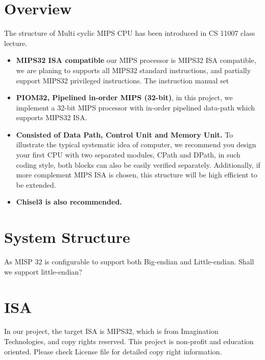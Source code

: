 \documentclass[a4paper]{article}
\begin{document}
\section{Overview} \label{overview}%
The structure of Multi cyclic MIPS CPU has been introduced in CS 11007 class lecture.
\begin{itemize}
	\item{\textbf{MIPS32 ISA compatible} our MIPS processor is MIPS32 ISA compatible, we are planing to supports all MIPS32 standard instructions, and partially support MIPS32 privileged instructions. The instruction manual set }
    \item{\textbf{PIOM32, Pipelined in-order MIPS (32-bit)}, in this project, we implement a 32-bit MIPS processor with in-order pipelined data-path which supports MIPS32 ISA.}
    \item{\textbf{Consisted of Data Path, Control Unit and Memory Unit.} To illustrate the typical systematic idea of computer, we recommend you design your first CPU with two separated modules, CPath and DPath, in such coding style, both blocks can also be easily verified separately. Additionally, if more complement MIPS ISA is chosen, this structure will be high efficient to be extended.}
    \item{\textbf{Chisel3 is also recommended.}}
\end{itemize}


\newpage
\section{System Structure} \label{Specification}%
As MISP 32 is configurable to support both Big-endian and Little-endian. Shall we support little-endian?

\newpage
\section{ISA}\label{isa}%
In our project, the target ISA is MIPS32, which is from Imagination Technologies, and copy rights reserved. This project is non-profit and education oriented. Please check License file for detailed copy right information. 
\end{document}
